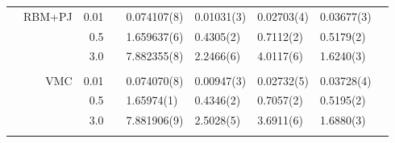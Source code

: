 \begin{table}
\begin{tabularx}{\textwidth}{R{1cm}rrcR{2.3cm}R{2.3cm}R{2.3cm}R{2.3cm}R{0.3cm}}
		&RBM+PJ & 0.01 && 0.074107(8) & 0.01031(3) & 0.02703(4) & 0.03677(3) \\
		&& 0.5 && 1.659637(6) & 0.4305(2) & 0.7112(2) & 0.5179(2)\\
		&& 3.0 && 7.882355(8) & 2.2466(6) & 4.0117(6) & 1.6240(3) \\ \hdashline \\
		
		&VMC & 0.01 && 0.074070(8) & 0.00947(3) & 0.02732(5) & 0.03728(4) \\
		&& 0.5 && 1.65974(1) & 0.4346(2) & 0.7057(2) & 0.5195(2) & \\
		&& 3.0 && 7.881906(9) & 2.5028(5) & 3.6911(6) & 1.6880(3) \\ \hdashline \\
	\end{tabularx}
\end{table} 
\iffalse
